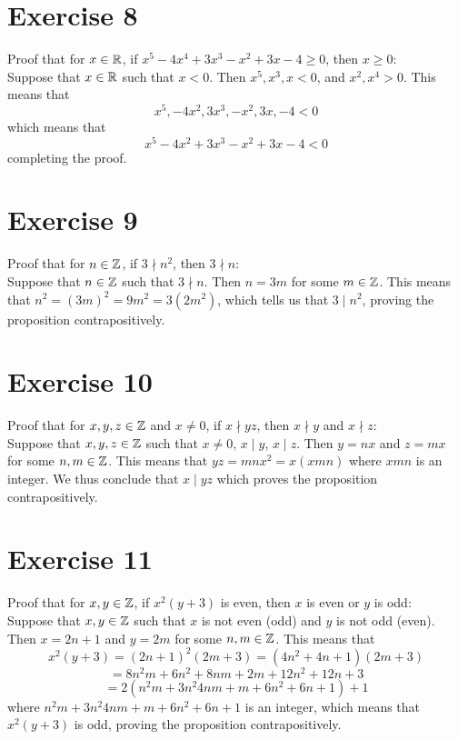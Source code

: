 \documentclass[12pt]{article}
\begin{document}
    \section*{Exercise 8}
    Proof that for $x \in \mathbb{R}$,
    if $x^5 - 4x^4 + 3x^3 - x^2 + 3x - 4 \geqslant 0$,
    then $x \geqslant 0$: \\
    Suppose that $x \in \mathbb{R}$
    such that $x < 0$.
    Then $x^5, x^3, x < 0$,
    and $x^2, x^4 > 0$.
    This means that
    \[ x^5, -4x^2, 3x^3, -x^2, 3x, -4 < 0 \]
    which means that 
    \[ x^5 - 4x^2 + 3x^3 - x^2 + 3x - 4 < 0  \]
    completing the proof. \\

    \section*{Exercise 9}
    Proof that for $n \in \mathbb{Z}$,
    if $3 \nmid n^2$,
    then $3 \nmid n$: \\
    Suppose that $n \in \mathbb{Z}$
    such that $3 \nmid n$.
    Then $n = 3m$ for some $m \in \mathbb{Z}$.
    This means that $n^2 = (3m)^2 = 9m^2 = 3(2m^2)$,
    which tells us that $3 \mid n^2$,
    proving the proposition contrapositively. \\
    
    \section*{Exercise 10}
    Proof that for $x, y, z \in \mathbb{Z}$ and $x \neq 0$,
    if $x \nmid yz$,
    then $x \nmid y$ and $x \nmid z$: \\
    Suppose that  $x, y, z \in \mathbb{Z}$
    such that $x \neq 0$, $x \mid y$, $x \mid z$. 
    Then $y = nx$ and $z = mx$ for some $n, m \in \mathbb{Z}$.
    This means that $yz = mnx^2 = x(xmn)$
    where $xmn$ is an integer.
    We thus conclude that $x \mid yz$
    which proves the proposition contrapositively. \\

    \section*{Exercise 11}
    Proof that for $x, y \in \mathbb{Z}$,
    if $x^2(y+3)$ is even,
    then $x$ is even or $y$ is odd: \\
    Suppose that $x, y \in \mathbb{Z}$
    such that $x$ is not even (odd) and $y$ is not odd (even).
    Then $x = 2n + 1$ and $y = 2m$ for some $n, m \in \mathbb{Z}$.
    This means that
    \[ x^2(y+3) = (2n+1)^2(2m + 3)
    = (4n^2 + 4n + 1)(2m + 3) \]
    \[ = 8n^2m + 6n^2 + 8nm + 2m + 12n^2 + 12n + 3 \]
    \[ = 2(n^2m + 3n^2  4nm + m + 6n^2 + 6n + 1) + 1 \]
    where $n^2m + 3n^2  4nm + m + 6n^2 + 6n + 1$ is an integer,
    which means that $x^2(y+3)$ is odd,
    proving the proposition contrapositively. \\
\end{document}
